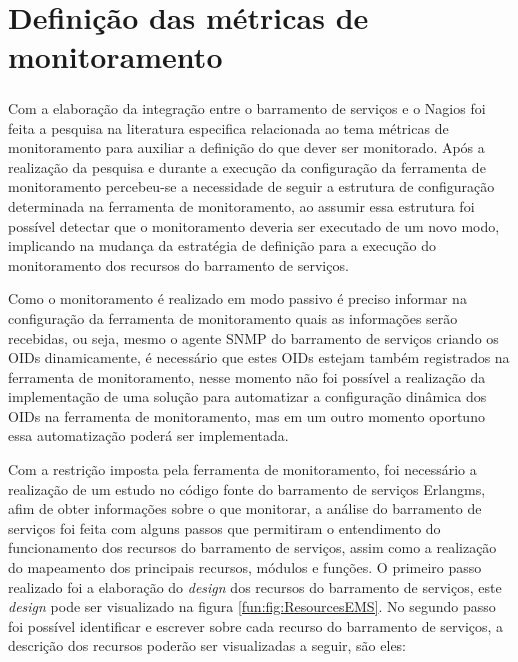 
\section{Definição das métricas de monitoramento}
\label{metricas_monitoramento}

Com a elaboração da integração entre o barramento de serviços e o Nagios\textsuperscript{\textregistered} foi feita a pesquisa na literatura especifica relacionada ao tema métricas de monitoramento para auxiliar a definição do que dever ser monitorado. Após a realização da pesquisa e durante a execução da configuração da ferramenta de monitoramento percebeu-se a necessidade de seguir a estrutura de configuração determinada na ferramenta de monitoramento, ao assumir essa estrutura foi possível detectar que o monitoramento deveria ser executado de um novo modo, implicando na mudança da estratégia de definição para a execução do monitoramento dos recursos do barramento de serviços. 

Como o monitoramento é realizado em modo passivo é preciso informar na configuração da ferramenta de monitoramento quais as informações serão recebidas, ou seja, mesmo o agente \acrshort{SNMP} do barramento de serviços criando os \acrshort{OID}s dinamicamente, é necessário que estes \acrshort{OID}s estejam também registrados na ferramenta de monitoramento, nesse momento  não foi possível a realização da implementação de uma solução para automatizar a configuração dinâmica dos \acrshort{OID}s na ferramenta de monitoramento, mas em um outro momento oportuno essa automatização poderá ser implementada.

Com a restrição imposta pela ferramenta de monitoramento, foi necessário a realização de um estudo no código fonte do barramento de serviços Erlangms, afim de obter informações sobre o que monitorar, a análise do barramento de serviços foi feita com alguns passos que permitiram o entendimento do funcionamento dos recursos do barramento de serviços, assim como a realização do mapeamento dos principais recursos, módulos e funções. O primeiro passo realizado foi a elaboração do \textit{design} dos recursos do barramento de serviços, este \textit{design} pode ser visualizado na figura \ref{fun:fig:ResourcesEMS}. No segundo passo foi possível identificar e escrever sobre cada recurso do barramento de serviços, a descrição dos recursos poderão ser visualizadas a seguir, são eles:

